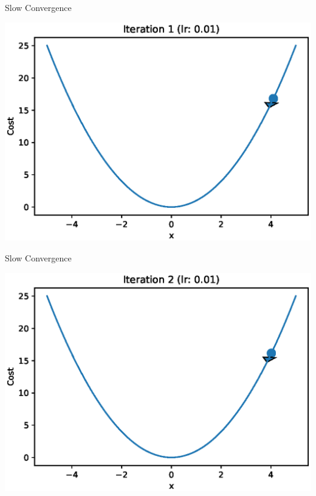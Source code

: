 \documentclass{beamer}
\begin{document}
	\begin{frame}{Slow Convergence}
		\begin{center}
			\includegraphics[totalheight=6cm]{gradient-descent/undershooting-1.eps}
		\end{center}
	\end{frame}
	
	\begin{frame}{Slow Convergence}
		\begin{center}
			\includegraphics[totalheight=6cm]{gradient-descent/undershooting-2.eps}
		\end{center}
	\end{frame}
	
\end{document}
